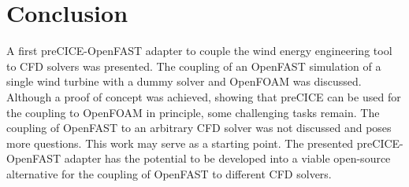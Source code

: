 \section{Conclusion}
\label{section:conclusion}

A first preCICE-OpenFAST adapter to couple the wind energy engineering tool to CFD solvers was presented. The coupling of an OpenFAST simulation of a single wind turbine with a dummy solver and OpenFOAM was discussed. Although a proof of concept was achieved, showing that preCICE can be used for the coupling to OpenFOAM in principle, some challenging tasks remain. The coupling of OpenFAST to an arbitrary CFD solver was not discussed and poses more questions. This work may serve as a starting point. The presented preCICE-OpenFAST adapter has the potential to be developed into a viable open-source alternative for the coupling of OpenFAST to different CFD solvers.

\begin{comment}
\begin{itemize}
\item First coupling of OpenFAST and preCICE was presented
\item Coupling with a dummy solver and OpenFOAM was discussed
\item Although a proof of concept was achieved, some challenging tasks remain to enable a full coupling to CFD solvers
\item How to map between OpenFAST and an arbitrary CFD solver? Where to place the mapping and smearing algorithm for the ALM method?
\item This work may serve as a starting point
\item Has the potential to be developed into a viable open-source alternative for the coupling of OpenFAST to different CFD solvers
\end{itemize}
\end{comment}

